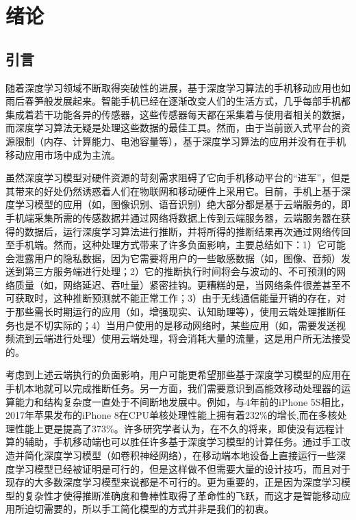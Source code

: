 \chapter{绪论}

\section{引言}
随着深度学习领域不断取得突破性的进展，基于深度学习算法的手机移动应用也如雨后春笋般发展起来。智能手机已经在逐渐改变人们的生活方式，几乎每部手机都集成着若干功能各异的传感器，这些传感器每天都在采集着与使用者相关的数据，而深度学习算法无疑是处理这些数据的最佳工具。然而，由于当前嵌入式平台的资源限制（内存、计算能力、电池容量等），基于深度学习算法的应用并没有在手机移动应用市场中成为主流。

虽然深度学习模型对硬件资源的苛刻需求阻碍了它向手机移动平台的“进军”，但是其带来的好处仍然诱惑着人们在物联网和移动硬件上采用它。目前，手机上基于深度学习模型的应用（如，图像识别、语音识别）绝大部分都是基于云端服务的，即手机端采集所需的传感数据并通过网络将数据上传到云端服务器，云端服务器在获得的数据后，运行深度学习算法进行推断，并将所得的推断结果再次通过网络传回至手机端。然而，这种处理方式带来了许多负面影响，主要总结如下：1）它可能会泄露用户的隐私数据，因为它需要将用户的一些敏感数据（如，图像、音频）发送到第三方服务端进行处理；2）它的推断执行时间将会与波动的、不可预测的网络质量（如，网络延迟、吞吐量）紧密挂钩。更糟糕的是，当网络条件很差甚至不可获取时，这种推断预测就不能正常工作；3）由于无线通信能量开销的存在，对于那些需长时期运行的应用（如，增强现实、认知助理等），使用云端处理推断任务也是不切实际的；4）当用户使用的是移动网络时，某些应用（如，需要发送视频流到云端进行处理）使用云端处理，将会消耗大量的流量，这是用户所无法接受的。

考虑到上述云端执行的负面影响，用户可能更希望那些基于深度学习模型的应用在手机本地就可以完成推断任务。另一方面，我们需要意识到高能效移动处理器的运算能力和结构复杂度一直处于不间断地发展中。例如，与4年前的iPhone 5S相比，2017年苹果发布的iPhone 8在CPU单核处理性能上拥有着232\%的增长,而在多核处理性能上更是提高了373\%。许多研究学者认为，在不久的将来，即使没有远程计算的辅助，手机移动端也可以胜任许多基于深度学习模型的计算任务。通过手工改造并简化深度学习模型（如卷积神经网络），在移动端本地设备上直接运行一些深度学习模型已经被证明是可行的，但是这样做不但需要大量的设计技巧，而且对于现存的大多数深度学习模型来说都是不可行的。更为重要的，正是因为深度学习模型的复杂性才使得推断准确度和鲁棒性取得了革命性的飞跃，而这才是智能移动应用所迫切需要的，所以手工简化模型的方式并非是我们的初衷。

